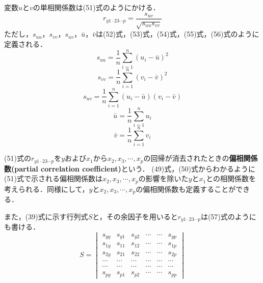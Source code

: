 \documentclass[dvipdfmx]{jsarticle}
\begin{document}
変数$u$と$v$の単相関係数は(51)式のようにかける．
\begin{equation}
  r_{y1\cdot23\cdots p}=\frac{s_{uv}}{\sqrt{s_{uu}s_{vv}}}
\end{equation}
ただし，$s_{uu}$，$s_{vv}$，$s_{uv}$，$\bar{u}$，$\bar{v}$は(52)式，(53)式，(54)式，(55)式，(56)式のように定義される．
\begin{equation}
  s_{uu}=\frac{1}{n}\sum_{i=1}^n (u_i-\bar{u})^2
\end{equation}
\begin{equation}
  s_{vv}=\frac{1}{n}\sum_{i=1}^n (v_i-\bar{v})^2
\end{equation}
\begin{equation}
  s_{uv}=\frac{1}{n}\sum_{i=1}^n (u_i-\bar{u})(v_i-\bar{v})
\end{equation}
\begin{equation}
  \bar{u}=\frac{1}{n}\sum_{i=1}^n u_i
\end{equation}
\begin{equation}
  \bar{v}=\frac{1}{n}\sum_{i=1}^n v_i
\end{equation}

(51)式の$r_{y1\cdot23\cdots p}$を$y$および$x_1$から$x_2,x_3,\cdots,x_p$の回帰が消去されたときの\textbf{偏相関係数(partial correlation coefficient)}という．
(49)式，(50)式からわかるように(51)式で示される偏相関係数は$x_2,x_3,\cdots,x_p$の影響を除いた$y$と$x_1$との相関係数を考えられる．同様にして，$y$と$x_2,x_3,\cdots,x_p$の偏相関係数も定義することができる．
\par
また，(39)式に示す行列式$S$と，その余因子を用いると$r_{y1\cdot23\cdots p}$は(57)式のようにも書ける．
\begin{equation}
  S=
  \begin{vmatrix}
    s_{yy} & s_{y1} & s_{y2} & \cdots & \cdots & s_{yp} \\
    s_{1y} & s_{11} & s_{12} & \cdots & \cdots & s_{1p} \\
    s_{2y} & s_{21} & s_{22} & \cdots & \cdots & s_{2p} \\
    \cdots & \cdots & \cdots & \cdots & \cdots & \cdots \\
    \cdots & \cdots & \cdots & \cdots & \cdots & \cdots \\
    s_{py} & s_{p1} & s_{p2} & \cdots & \cdots & s_{pp}
  \end{vmatrix}
  \tag{38}
\end{equation}
\end{document}
